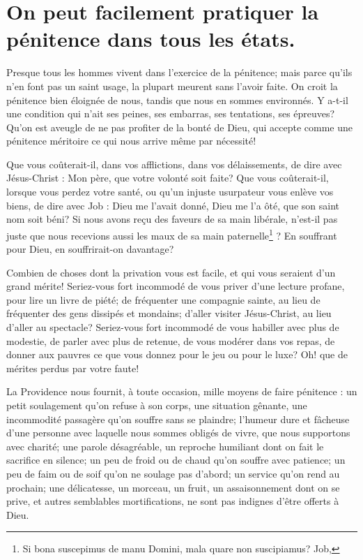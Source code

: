\documentclass[instructions.tex]{subfiles}
\begin{document}
 
\chapter{On peut facilement pratiquer la pénitence dans tous les états.}
 
Presque tous les hommes vivent dans l’exercice de la pénitence; mais parce qu’ils n’en font pas un saint usage, la plupart meurent sans l’avoir faite. On croit la pénitence bien éloignée de nous, tandis que nous en sommes environnés. Y a-t-il une condition qui n’ait ses peines, ses embarras, ses tentations, ses épreuves? Qu’on est aveugle de ne pas profiter de la bonté de Dieu, qui accepte comme une pénitence méritoire ce qui nous arrive même par nécessité!
 
Que vous coûterait-il, dans vos afflictions, dans vos délaissements, de dire avec Jésus-Christ : Mon père, que votre volonté soit faite? Que vous coûterait-il, lorsque vous perdez votre santé, ou qu’un injuste usurpateur vous enlève vos biens, de dire avec Job : Dieu me l’avait donné, Dieu me l’a ôté, que son saint nom soit béni? Si nous avons reçu des faveurs de sa main libérale, n’est-il pas juste que nous recevions aussi les maux de sa main paternelle\footnote{Si bona suscepimus de manu Domini, mala quare non suscipiamus? Job,} ? En souffrant pour Dieu, en souffrirait-on davantage?
 
Combien de choses dont la privation vous est facile, et qui vous seraient d’un grand mérite! Seriez-vous fort incommodé de vous priver d’une lecture profane, pour lire un livre de piété; de fréquenter une compagnie sainte, au lieu de fréquenter des gens dissipés et mondains; d’aller visiter Jésus-Christ, au lieu d’aller au spectacle? Seriez-vous fort incommodé de vous habiller avec plus de modestie, de parler avec plus de retenue, de vous modérer dans vos repas, de donner aux pauvres ce que vous donnez pour le jeu ou pour le luxe? Oh! que de mérites perdus par votre faute!
 
La Providence nous fournit, à toute occasion, mille moyens de faire pénitence : un petit soulagement qu’on refuse à son corps, une situation gênante, une incommodité passagère qu’on souffre sans se plaindre; l’humeur dure et fâcheuse d’une personne avec laquelle nous sommes obligés de vivre, que nous supportons avec charité; une parole désagréable, un reproche humiliant dont on fait le sacrifice en silence; un peu de froid ou de chaud qu’on souffre avec patience; un peu de faim ou de soif qu’on ne soulage pas d’abord; un service qu’on rend au prochain; une délicatesse, un morceau, un fruit, un assaisonnement dont on se prive, et autres semblables mortifications, ne sont pas indignes d’être offerts à Dieu.
 
\end{document}
